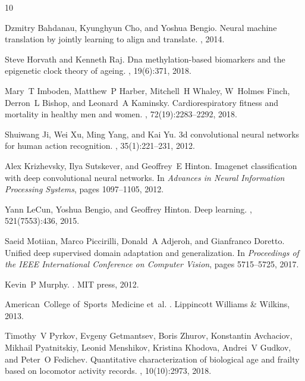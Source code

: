 \documentclass[numbers,webpdf]{ima-authoring-template}%
\theoremstyle{thmstyletwo}%
\numberwithin{equation}{section}
\begin{document}
\begin{thebibliography}{10}

Dzmitry Bahdanau, Kyunghyun Cho, and Yoshua Bengio.
\newblock Neural machine translation by jointly learning to align and
  translate.
, 2014.

Steve Horvath and Kenneth Raj.
\newblock Dna methylation-based biomarkers and the epigenetic clock theory of
  ageing.
, 19(6):371, 2018.

Mary~T Imboden, Matthew~P Harber, Mitchell~H Whaley, W~Holmes Finch, Derron~L
  Bishop, and Leonard~A Kaminsky.
\newblock Cardiorespiratory fitness and mortality in healthy men and women.
,
  72(19):2283--2292, 2018.

Shuiwang Ji, Wei Xu, Ming Yang, and Kai Yu.
\newblock 3d convolutional neural networks for human action recognition.
,
  35(1):221--231, 2012.

Alex Krizhevsky, Ilya Sutskever, and Geoffrey~E Hinton.
\newblock Imagenet classification with deep convolutional neural networks.
\newblock In {\em Advances in Neural Information Processing Systems}, pages
  1097--1105, 2012.

Yann LeCun, Yoshua Bengio, and Geoffrey Hinton.
\newblock Deep learning.
, 521(7553):436, 2015.

Saeid Motiian, Marco Piccirilli, Donald~A Adjeroh, and Gianfranco Doretto.
\newblock Unified deep supervised domain adaptation and generalization.
\newblock In {\em Proceedings of the IEEE International Conference on Computer
  Vision}, pages 5715--5725, 2017.

Kevin~P Murphy.
.
\newblock MIT press, 2012.

American~College of~Sports~Medicine et~al.
.
\newblock Lippincott Williams \& Wilkins, 2013.

Timothy~V Pyrkov, Evgeny Getmantsev, Boris Zhurov, Konstantin Avchaciov,
  Mikhail Pyatnitskiy, Leonid Menshikov, Kristina Khodova, Andrei~V Gudkov, and
  Peter~O Fedichev.
\newblock Quantitative characterization of biological age and frailty based on
  locomotor activity records.
, 10(10):2973, 2018.


\end{thebibliography}
\end{document}
